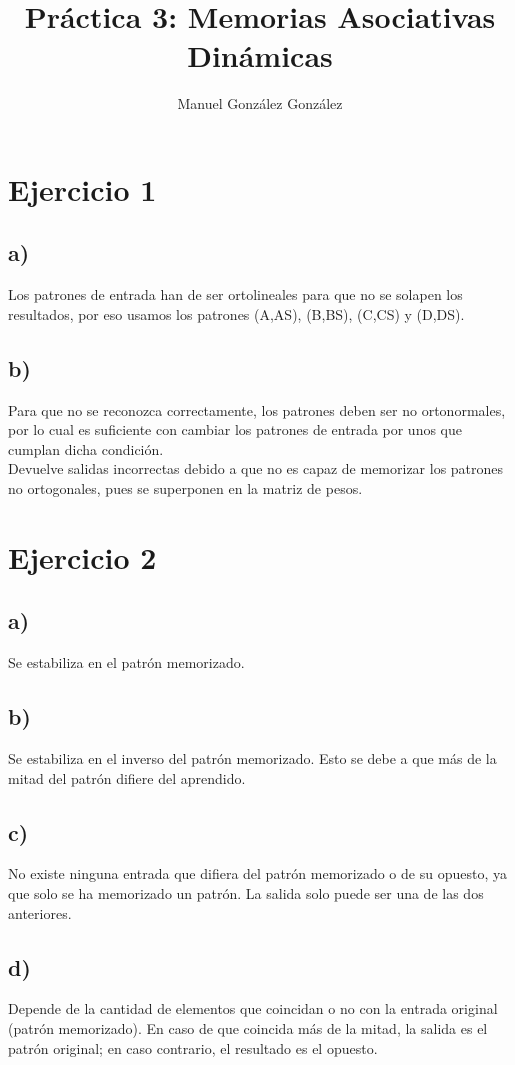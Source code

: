 \documentclass[12pt]{article}
\title{Práctica 3: Memorias Asociativas Dinámicas}
\author{Manuel González González}
\begin{document}
\maketitle
\section*{Ejercicio 1}
\subsection*{a)}
Los patrones de entrada han de ser ortolineales para que no se solapen los resultados, por eso usamos los patrones (A,AS), (B,BS), (C,CS) y (D,DS).
\subsection*{b)}
Para que no se reconozca correctamente, los patrones deben ser no ortonormales, por lo cual es suficiente con cambiar los patrones de entrada por unos que cumplan dicha condición.\\
Devuelve salidas incorrectas debido a que no es capaz de memorizar los patrones no ortogonales, pues se superponen en la matriz de pesos.

\section*{Ejercicio 2}
\subsection*{a)}
Se estabiliza en el patrón memorizado.
\subsection*{b)}
Se estabiliza en el inverso del patrón memorizado. Esto se debe a que más de la mitad del patrón difiere del aprendido.
\subsection*{c)}
No existe ninguna entrada que difiera del patrón memorizado o de su opuesto, ya que solo se ha memorizado un patrón. La salida solo puede ser una de las dos anteriores.
\subsection*{d)} 
Depende de la cantidad de elementos que coincidan o no con la entrada original (patrón memorizado). En caso de que coincida más de la mitad, la salida es el patrón original; en caso contrario, el resultado es el opuesto. 
\end{document}
